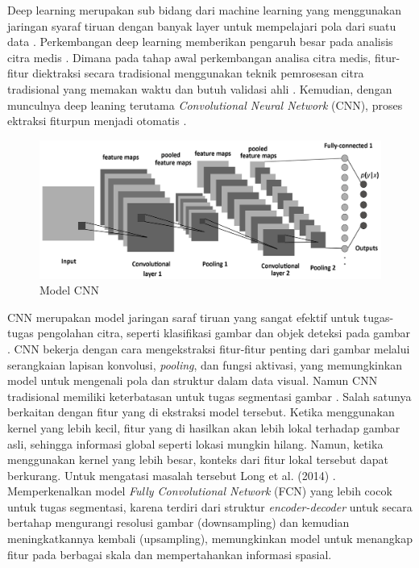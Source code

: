 \noindent Deep learning merupakan sub bidang dari machine learning yang menggunakan jaringan syaraf tiruan dengan banyak layer untuk mempelajari pola dari suatu data \cite{goodfellow_deep_2016,yang_deep_2023}. Perkembangan deep learning memberikan pengaruh besar pada analisis citra medis \cite{sistaninejhad_review_2023}. Dimana pada tahap awal perkembangan analisa citra medis, fitur-fitur diektraksi secara tradisional menggunakan teknik pemrosesan citra tradisional yang memakan waktu dan butuh validasi ahli \cite{huang_fully_2022}.  Kemudian, dengan munculnya deep leaning terutama \textit{Convolutional Neural Network} (CNN), proses ektraksi fiturpun menjadi otomatis \cite{huang_fully_2022,azad_medical_2022}. 

\begin{figure}[H]
	\centering
	\includegraphics[scale=.1]{gambar/CNN.PNG}
	\caption{Model CNN \cite{albelwi_framework_2017}}
	\label{fig:CNN}
\end{figure}

\noindent CNN merupakan model jaringan saraf tiruan yang sangat efektif untuk tugas-tugas pengolahan citra, seperti klasifikasi gambar dan objek deteksi pada gambar \cite{celeghin_convolutional_2023}. CNN bekerja dengan cara mengekstraksi fitur-fitur penting dari gambar melalui serangkaian lapisan konvolusi, \textit{pooling}, dan fungsi aktivasi, yang memungkinkan model untuk mengenali pola dan struktur dalam data visual. Namun CNN tradisional memiliki keterbatasan untuk tugas segmentasi  gambar \cite{huang_fully_2022, azad_medical_2022, jasim_towards_2023}. Salah satunya berkaitan dengan fitur yang di ekstraksi model tersebut. Ketika menggunakan kernel yang lebih kecil, fitur yang di hasilkan akan lebih lokal terhadap gambar asli, sehingga informasi global seperti lokasi mungkin hilang. Namun, ketika menggunakan kernel yang lebih besar, konteks dari fitur lokal tersebut dapat berkurang. Untuk mengatasi masalah tersebut Long et al. (2014) \cite{long_fully_2014}. Memperkenalkan model \textit{Fully Convolutional Network} (FCN) yang lebih cocok untuk tugas segmentasi, karena terdiri dari struktur \textit{encoder-decoder} untuk secara bertahap mengurangi resolusi gambar (downsampling) dan kemudian meningkatkannya kembali (upsampling), memungkinkan model untuk menangkap fitur pada berbagai skala dan mempertahankan informasi spasial.



